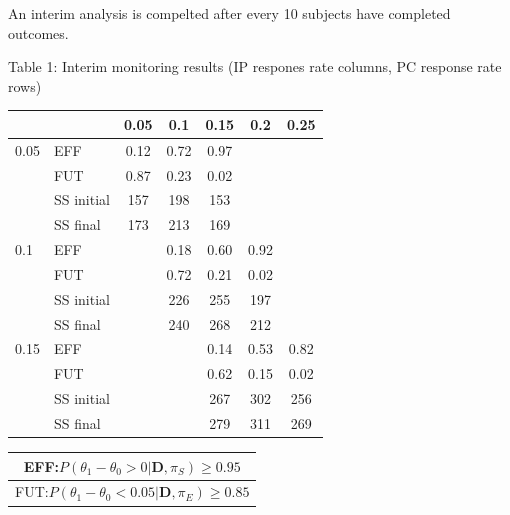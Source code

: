 \documentclass[12pt]{article}
\begin{document}
An interim analysis is compelted after every 10 subjects have completed outcomes.
\newpage
\begin{center}

Table 1: Interim monitoring results (IP respones rate columns, PC response rate rows)

\begin{tabular}{ll|ccccc}
	&		&	0.05	&	0.1	&	0.15	&	0.2	&	0.25	\\
\hline													
0.05	&	EFF	&	0.12	&	0.72	&	0.97	&		&		\\
	&	FUT	&	0.87	&	0.23	&	0.02	&		&		\\
	&	SS initial	&	157	&	198	&	153	&		&		\\
	&	SS final	&	173	&	213	&	169	&		&		\\
\hline													
0.1	&	EFF	&		&	0.18	&	0.60	&	0.92	&		\\
	&	FUT	&		&	0.72	&	0.21	&	0.02	&		\\
	&	SS initial	&		&	226	&	255	&	197	&		\\
	&	SS final	&		&	240	&	268	&	212	&		\\
\hline													
0.15	&	EFF	&		&		&	0.14	&	0.53	&	0.82	\\
	&	FUT	&		&		&	0.62	&	0.15	&	0.02	\\
	&	SS initial	&		&		&	267	&	302	&	256	\\
	&	SS final	&		&		&	279	&	311	&	269	\\
\hline													
										

\end{tabular}



\begin{tabular}{|c|}
\hline
EFF:$P(\theta_1-\theta_0>0|\textbf{D},\pi_S)\geq 0.95$\\
\hline
FUT:$P(\theta_1-\theta_0<0.05|\textbf{D},\pi_E)\geq 0.85$\\
\hline
\end{tabular}
\end{center}
\newpage
\end{document}
